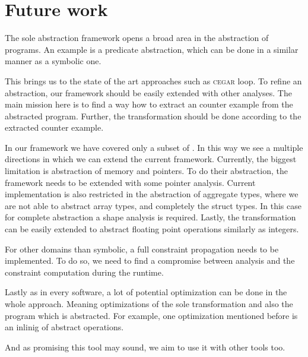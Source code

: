 \section{Future work}

The sole abstraction framework opens a broad area in the abstraction of
programs. An example is a predicate abstraction, which can be done in a
similar manner as a symbolic one.

This brings us to the state of the art approaches such as \textsc{cegar} loop.
To refine an abstraction, our framework should be easily extended with other
analyses. The main mission here is to find a way how to extract an counter
example from the abstracted program. Further, the transformation should be done
according to the extracted counter example.

In our framework we have covered only a subset of \LLVM. In this way we see a
multiple directions in which we can extend the current framework. Currently, the
biggest limitation is abstraction of memory and pointers. To do their
abstraction, the framework needs to be extended with some pointer analysis.
Current implementation is also restricted in the abstraction of aggregate types,
where we are not able to abstract array types, and completely the struct
types. In this case for complete abstraction a shape analysis is
required. Lastly, the transformation can be easily extended to abstract
floating point operations similarly as integers.

For other domains than symbolic, a full constraint propagation needs to be
implemented. To do so, we need to find a compromise between analysis and the
constraint computation during the runtime.

Lastly as in every software, a lot of potential optimization can be done in the whole approach.
Meaning optimizations of the sole transformation and also the program which is
abstracted. For example, one optimization mentioned before is an inlinig of abstract
operations.

And as promising this tool may sound, we aim to use it with other tools too.

